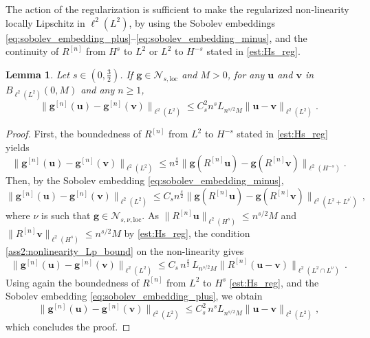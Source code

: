 \documentclass[12pt,a4paper]{amsart}
\newtheorem{lemma}[theorem]{Lemma}
\numberwithin{equation}{section}
\newcommand{\ulu}{\boldsymbol{u}}
\newcommand{\ulv}{\boldsymbol{v}}
\newcommand{\ulg}{\boldsymbol{g}}
\newcommand{\Clip}[1]{L_{#1}}
\newcommand{\Nloc}{\mathscr{N}_{s,\mathrm{loc}}}
\newcommand{\Nlocnu}{\mathscr{N}_{s,\nu,\mathrm{loc}}}
\begin{document}
	The action of the regularization is sufficient to make the regularized non-linearity locally Lipschitz in $\ell^2(L^2) $, by using the Sobolev embeddings \eqref{eq:sobolev_embedding_plus}--\eqref{eq:sobolev_embedding_minus}, and the continuity of $R^{[n]}$ from $H^s$ to $L^2$ or $L^2$ to $H^{-s}$ stated in \eqref{est:Hs_reg}. 
	\begin{lemma} Let $s\in(0,\frac32)$. If $\ulg\in\Nloc$ and $M>0$, for any $ \ulu$ and $\ulv$ in $B_{\ell^2(L^2)}(0,M)$ and any $ n \geq 1$,
		\begin{equation}
			\label{est:loc_lipsch_L2}
			\| \ulg^{[n]}(\ulu) - \ulg^{[n]}(\ulv) \|_{\ell^2(L^2)}
			\leq C_s^2n^s \Clip{n^{s/2}M}   \|\ulu-\ulv\|_{\ell^2(L^2)}.
		\end{equation}
	\end{lemma}
	\begin{proof}
		First, the boundedness of $R^{[n]}$ from $L^2$ to $H^{-s}$ stated in \eqref{est:Hs_reg} yields
		\begin{equation}
			\| \ulg^{[n]}(\ulu) -\ulg^{[n]}(\ulv)\|_{\ell^2(L^2)} \leq n^{\frac{s}{2}} \| \ulg(R^{[n]}\ulu) -\ulg(R^{[n]}\ulv) \|_{\ell^2(H^{-s})}. 
		\end{equation}
		Then, by the Sobolev embedding \eqref{eq:sobolev_embedding_minus}, 
		\begin{equation}
			\| \ulg^{[n]}(\ulu) -\ulg^{[n]}(\ulv)\|_{\ell^2(L^2)} \leq C_{s} n^{\frac{s}{2}} \| \ulg(R^{[n]}\ulu) -\ulg(R^{[n]}\ulv) \|_{\ell^2(L^2+L^{\nu^\prime})}\,,
		\end{equation}
		where $\nu$ is such that $\ulg\in\Nlocnu$. As $\|R^{[n]}\ulu\|_{\ell^2(H^{s})}\leq n^{s/2}M$ and $\|R^{[n]}\ulv\|_{\ell^2(H^{s})}\leq n^{s/2}M$ by \eqref{est:Hs_reg}, the condition \ref{ass2:nonlinearity_Lp_bound} on the non-linearity gives
		\begin{equation*}
			\| \ulg^{[n]}(\ulu) -\ulg^{[n]}(\ulv) \|_{\ell^2(L^2)}
			\leq C_{s} \, n^{\frac{s}{2}} \,
			\Clip{n^{s/2}M} \|R^{[n]}(\ulu-\ulv) \|_{\ell^2(L^2\cap L^{\nu})} \,.
		\end{equation*}
		Using again the boundedness of $R^{[n]}$ from $L^2$ to $H^s$ \eqref{est:Hs_reg}, and the Sobolev embedding \eqref{eq:sobolev_embedding_plus}, we obtain
		\begin{equation}
			\| \ulg^{[n]}(\ulu) -\ulg^{[n]}(\ulv) \|_{\ell^2(L^2)}	\leq C_s^2\, n^s \Clip{n^{s/2}M} \|\ulu-\ulv \|_{\ell^2(L^2)},
		\end{equation}
		which concludes the proof.
	\end{proof}
	
\end{document}
